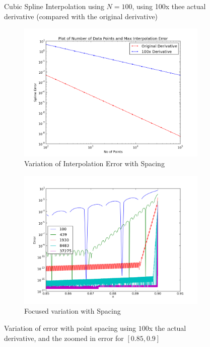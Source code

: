 \documentclass[11pt]{article}
\begin{document}
\begin{figure}[h]
\caption{Cubic Spline Interpolation using $N=100$, using 100x thee actual derivative (compared with the original derivative)}
\label{fig:q5_1}        
\end{figure}    


\pagebreak
\begin{figure}
        \centering
        \begin{subfigure}{.5\textwidth}
  \centering
        \includegraphics[width=\linewidth]{q5/loglogerr.png}
                \caption{Variation of Interpolation Error with Spacing}
                \label{fig:q5_loglogerr}
                \end{subfigure}%
\begin{subfigure}{.5\textwidth}
  \centering
        \includegraphics[width=\linewidth]{q5/err_vary.png}
                \caption{Focused variation with Spacing}
                \label{fig:q5_err_vary}
	\end{subfigure}
            
\caption{Variation of error with point spacing using $100$x the actual derivative, and the zoomed in error for $[0.85,0.9]$}
\label{fig:q5_2}        
\end{figure}  
\end{document}
